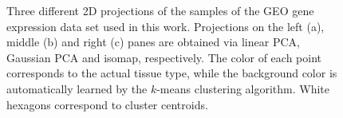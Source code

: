 \begin{figure}[!ht]
    \centering
    \hfill%
    \hfill%
    \caption{Three different 2D projections of the samples of the GEO gene expression data set used in this work. Projections on the left (a), middle (b) and right (c) panes are obtained via linear PCA, Gaussian PCA and isomap, respectively. The color of each point corresponds to the actual tissue type, while the background color is automatically learned by the $k$-means clustering algorithm. White hexagons correspond to cluster centroids.}\label{fig:scatter}
\end{figure}

